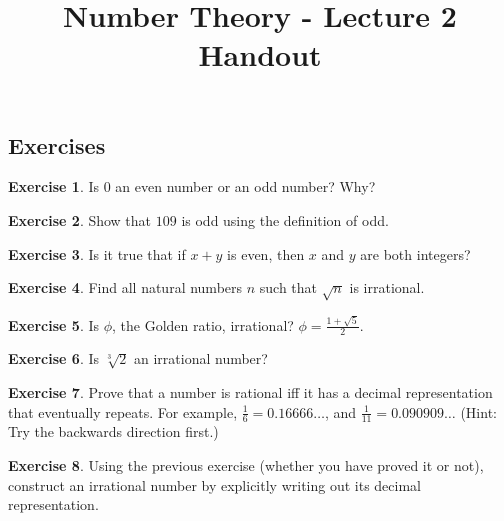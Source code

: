 \documentclass[11pt]{article}
\theoremstyle{definition}
\newtheorem{exercise}{Exercise}
\numberwithin{thm}{section}
\begin{document}
\title{Number Theory - Lecture 2 Handout}

\maketitle


\subsection{Exercises}

\begin{exercise} Is $0$ an even number or an odd number? Why?
\end{exercise}

\begin{exercise} Show that $109$ is odd using the definition of odd.
\end{exercise}

\begin{exercise} Is it true that if $x + y$ is even, then $x$ and $y$ are both integers?
\end{exercise}

\begin{exercise} Find all natural numbers $n$ such that $\sqrt{n}$ is irrational.
\end{exercise}

\begin{exercise} Is $\phi$, the Golden ratio, irrational? $\phi = \frac{1 + \sqrt{5}}{2}$.
\end{exercise}

\begin{exercise} Is $\sqrt[3]{2}$ an irrational number?
\end{exercise}

\begin{exercise} Prove that a number is rational iff it has a decimal representation that eventually repeats. For example, $\frac{1}{6} = 0.16666 \ldots$, and $\frac{1}{11} = 0.090909\ldots$ (Hint: Try the backwards direction first.)
\end{exercise}

\begin{exercise} Using the previous exercise (whether you have proved it or not), construct an irrational number by explicitly writing out its decimal representation.
\end{exercise}
\end{document}
